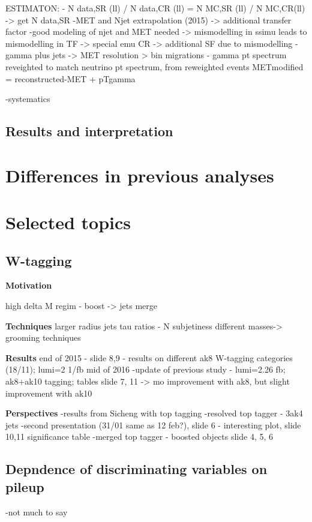 ESTIMATON:
- N data,SR (ll) / N data,CR (ll) = N MC,SR (ll) / N MC,CR(ll) -> get N data,SR
-MET and Njet extrapolation (2015) -> additional transfer factor
-good modeling of njet and MET needed -> mismodelling in ssimu leads to mismodelling in TF -> special emu CR -> additional SF due to mismodelling
-gamma plus jets -> MET resolution > bin migrations - gamma pt spectrum reveighted to match neutrino pt spectrum, from reweighted events METmodified = reconstructed-MET + pTgamma


-systematics

\subsection{Results and interpretation}

\section{Differences in previous analyses}

\section{Selected topics}

\subsection{W-tagging}

\textbf{Motivation}

	high delta M regim - boost -> jets merge

\textbf{Techniques}
	larger radius jets
	tau ratios - N subjetiness
	different masses-> grooming techniques
	
\textbf{Results}
	end of 2015 - slide 8,9 - results on different ak8 W-tagging categories (18/11); lumi=2 1/fb
	mid of 2016 -update of previous study - lumi=2.26 fb; ak8+ak10 tagging; tables slide 7, 11 -> mo improvement with ak8, but slight improvement with ak10 


\textbf{Perspectives}
	-results from Sicheng with top tagging
	-resolved top tagger - 3ak4 jets
	-second presentation (31/01 same as 12 feb?), slide 6 - interesting plot, slide 10,11 significance table
        -merged top tagger - boosted objects
		slide 4, 5, 6

\subsection{Depndence of discriminating variables on pileup}
-not much to say
	

